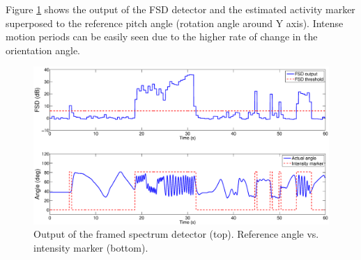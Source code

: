 \documentclass{IOS-Book-Article}
\begin{document}
Figure \ref{fig:FSD_output} shows the output of the FSD detector and the estimated activity marker superposed to the reference pitch angle (rotation angle around Y axis). Intense motion periods can be easily seen due to the higher rate of change in the orientation angle. 
\begin{figure}[t]
\centering
\includegraphics[width=1\textwidth]{figures/FSD_output.eps}
\caption{Output of the framed spectrum detector (top). Reference angle vs. intensity marker (bottom).}
\label{fig:FSD_output}
\end{figure}
\end{document}
